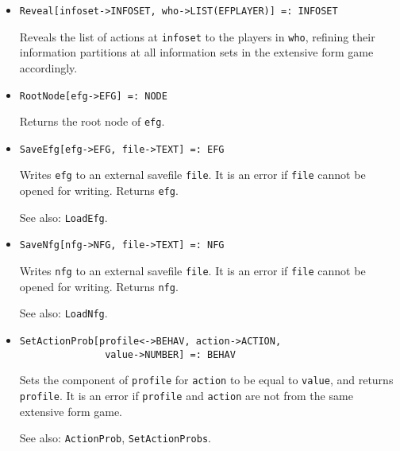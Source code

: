 \begin{itemize}
\item{}
\protect \large \begin{verbatim}
Reveal[infoset->INFOSET, who->LIST(EFPLAYER)] =: INFOSET 
\end{verbatim}\normalsize

\bd
Reveals the list of actions at \verb+infoset+ to the players in \verb+who+,
refining their information partitions at
all information sets in the extensive form game accordingly.  
\ed

\item{}
\protect \large \begin{verbatim}
RootNode[efg->EFG] =: NODE 
\end{verbatim}\normalsize

\bd
Returns the root node of \verb+efg+.
\ed


\item{}
\protect \large \begin{verbatim}
SaveEfg[efg->EFG, file->TEXT] =: EFG 
\end{verbatim}\normalsize

\bd
Writes \verb+efg+ to an external savefile \verb+file+.  It is an error
if \verb+file+ cannot be opened for writing.  Returns \verb+efg+.
\item [See also:] \verb+LoadEfg+.
\ed

\item{}
\protect \large \begin{verbatim}
SaveNfg[nfg->NFG, file->TEXT] =: NFG 
\end{verbatim}\normalsize

\bd
Writes \verb+nfg+ to an external savefile \verb+file+.  It is an
error if \verb+file+ cannot be opened for writing.  Returns \verb+nfg+.
\item [See also:] \verb+LoadNfg+.
\ed


\item{}
\protect \large \begin{verbatim} 
SetActionProb[profile<->BEHAV, action->ACTION, 
               value->NUMBER] =: BEHAV 
\end{verbatim}\normalsize

\bd
Sets the component of \verb+profile+ for
\verb+action+ to be equal to \verb+value+, and 
returns \verb+profile+.  It is an error if \verb+profile+ and \verb+action+
are not from the same extensive form game. 
\item [See also:] \verb+ActionProb+, \verb+SetActionProbs+.
\ed


\end{itemize}
